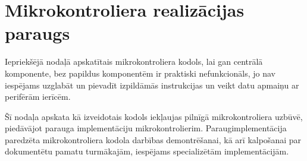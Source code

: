 \section{Mikrokontroliera realizācijas paraugs}
	Iepriekšējā nodaļā apskatītais mikrokontroliera kodols, lai gan centrālā
	komponente, bez papildus komponentēm ir praktiski nefunkcionāls, jo
	nav iespējams uzglabāt un pievadīt izpildāmās instrukcijas un veikt
	datu apmaiņu ar perifērām ierīcēm.
	
	
	Šī nodaļa apskata kā izveidotais kodols iekļaujas
	pilnīgā mikrokontroliera uzbūvē, piedāvājot	parauga implementāciju
	mikrokontrolierim. 
	Paraug\-implementācija paredzēta mikrokontroliera kodola 
	darbības demontrēšanai, kā arī kalpošanai par dokumentētu pamatu 
	turmākajām, iespējams specializētām implementācijām.
	
	
	
	 \pagebreak[3]
	
